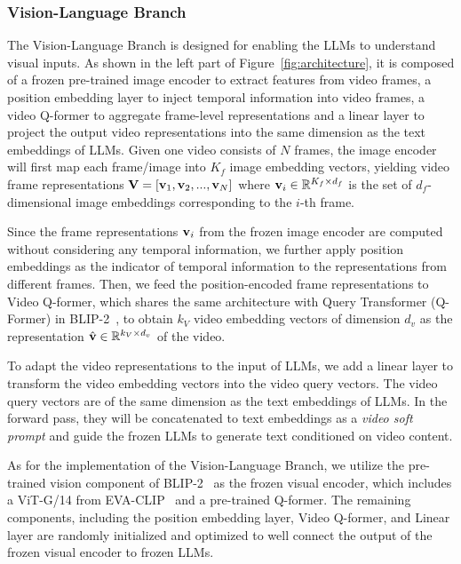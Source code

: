 \documentclass[11pt]{article}
\begin{document}
\subsubsection{Vision-Language Branch} 
The Vision-Language Branch is designed for enabling the LLMs to understand visual inputs. As shown in the left part of Figure~\ref{fig:architecture}, it is composed of a frozen pre-trained image encoder to extract features from video frames, a position embedding layer to inject temporal information into video frames, a video Q-former to aggregate frame-level representations and a linear layer to project the output video representations into the same dimension as the text embeddings of LLMs. Given one video consists of $N$ frames, the image encoder will first map each frame/image into $K_f$ image embedding vectors, yielding video frame representations $\mathrm{\bf V} = [\mathrm{\bf v}_1,\mathrm{\bf v}_2,...,\mathrm{\bf v}_N]$ where $\mathrm{\bf v}_i \in \mathbb{R}^{ K_f \times d_f}$ is the set of $d_f$-dimensional image embeddings  corresponding to the $i$-th frame.  

Since the frame representations $\mathrm{\bf v}_i$ from the frozen image encoder are computed without considering any temporal information, we further apply position embeddings as the indicator of temporal information to the representations from different frames. Then, we feed the position-encoded frame representations to Video Q-former, which shares the same architecture with Query Transformer (Q-Former) in BLIP-2~\citep{li2023blip2bl}, to obtain $k_V$ video embedding vectors of dimension $d_v$ as the representation $\hat{\mathrm{\bf v}} \in \mathbb{R} ^ {k_V \times d_v}$ of the video.

To adapt the video representations to the input of LLMs, we add a linear layer to transform the video embedding vectors into the video query vectors. The video query vectors are of the same dimension as the text embeddings of LLMs. In the forward pass, they will be concatenated to text embeddings as a \textit{video soft prompt} and guide the frozen LLMs to generate text conditioned on video content.

As for the implementation of the Vision-Language Branch, we utilize the pre-trained vision component of BLIP-2~\citep{li2023blip2bl} as the frozen visual encoder, which includes a ViT-G/14 from EVA-CLIP~\citep{fang2022eva} and a pre-trained Q-former. The remaining components, including the position embedding layer, Video Q-former, and Linear layer are randomly initialized and optimized to well connect the output of the frozen visual encoder to frozen LLMs.
\end{document}
